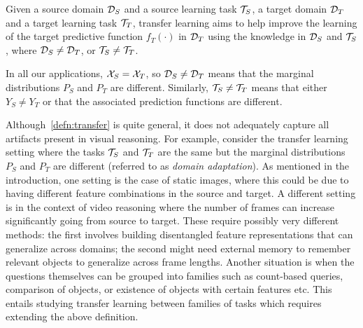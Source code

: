 \begin{definition}
	\label{defn:transfer}
	Given a source domain $\mathcal{D}_S$ and a source learning task $\mathcal{T}_S$, a target domain $\mathcal{D}_T$ and a target learning task $\mathcal{T}_T$, transfer learning aims to help improve the
	learning of the target predictive function $f_T(\cdot)$ in $\mathcal{D}_T$ using the knowledge  in $\mathcal{D}_S$ and $\mathcal{T}_S$, where $\mathcal{D}_S \ne \mathcal{D}_T$, or $\mathcal{T}_S \ne \mathcal{T}_T$.
\end{definition}
In all our applications, $\mathcal{X}_S = \mathcal{X}_T$, so $\mathcal{D}_S \ne \mathcal{D}_T$ means that the marginal distributions $P_S$ and $P_T$ are different.
Similarly, $\mathcal{T}_S \ne \mathcal{T}_T$ means that either $Y_S \ne Y_T$ or that the associated prediction functions are different.

Although~\cref{defn:transfer} is quite general, it does not adequately capture all artifacts present in visual reasoning.
For example, consider the transfer learning setting where the tasks $\mathcal{T}_S$ and $\mathcal{T}_T$ are the same
but the marginal distributions $P_S$ and $P_T$ are different (referred to as \emph{domain adaptation}).
As mentioned in the introduction, one setting is the case of static images,
where this could be due to having different feature combinations in the source and target.
A different setting is in the context of video reasoning where the number of frames can increase significantly going from source to target.
These require possibly very different methods: the first involves building disentangled feature representations that can generalize across
domains; the second might need external memory to remember relevant objects to generalize across frame lengths.
Another situation is when the questions themselves can be grouped into families such as count-based queries,
comparison of objects, or existence of objects with certain features etc.
This entails studying transfer learning between families of tasks which requires extending the above definition.


